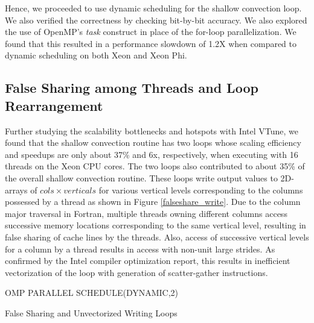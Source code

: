 Hence, we proceeded to use dynamic scheduling for the shallow convection loop. We also verified the correctness by checking bit-by-bit accuracy. We also explored the use of OpenMP's {\em task} construct in place of the for-loop parallelization. We found that this resulted in a performance slowdown of 1.2X when compared to dynamic scheduling on both Xeon and Xeon Phi.


\subsection{False Sharing among Threads and Loop Rearrangement}

Further studying the scalability bottlenecks and hotspots with Intel VTune, we found that the shallow convection routine has two loops whose scaling efficiency and speedups are only about 37\% and 6x, respectively, when executing with 16 threads on the Xeon CPU cores. The two loops also contributed to about 35\% of the overall shallow convection routine. These loops write output values to 2D-arrays of $cols\times verticals$ for various vertical levels corresponding to the columns possessed by a thread as shown in Figure \ref{falseshare_write}. Due to the column major traversal in Fortran, multiple threads owning different columns access successive memory locations corresponding to the same vertical level, resulting in false sharing of cache lines by the threads. Also, access of successive vertical levels for a column by a thread results in access with non-unit large strides. As confirmed by the Intel compiler optimization report, this results in inefficient vectorization of the loop with generation of scatter-gather instructions.

\begin{algorithm}
\begin{small}


  OMP PARALLEL SCHEDULE(DYNAMIC,2)
\caption{False Sharing and Unvectorized Writing Loops}
\label{falseshare_write}
\end{small}
\end{algorithm}

